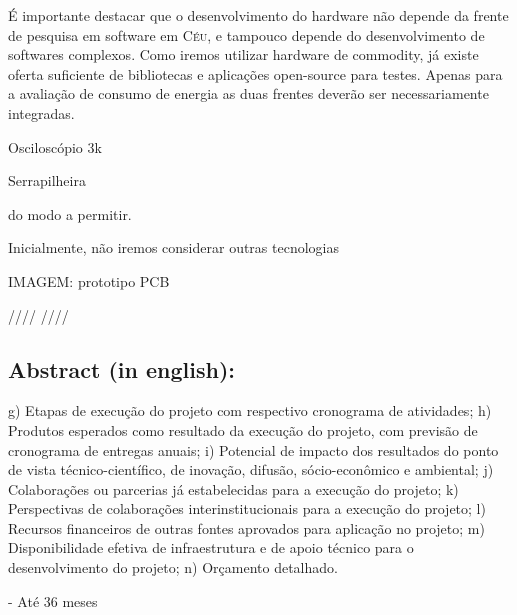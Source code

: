 \documentclass[titlepage,12pt]{article}
\newcommand{\CEU}{\textsc{C\'{e}u}\xspace}
\begin{document}
É importante destacar que o desenvolvimento do hardware não depende da frente
de pesquisa em software em \CEU, e tampouco depende do desenvolvimento de
softwares complexos.
Como iremos utilizar hardware de commodity, já existe oferta suficiente de
bibliotecas e aplicações open-source para testes.
%
Apenas para a avaliação de consumo de energia as duas frentes deverão ser
necessariamente integradas.

Osciloscópio 3k

Serrapilheira


 do modo a permitir.



Inicialmente, não iremos considerar outras tecnologias


IMAGEM: prototipo PCB

////
////

\subsection{ Abstract (in english): }


g) Etapas de execução do projeto com respectivo cronograma de atividades;
h) Produtos esperados como resultado da execução do projeto, com previsão de cronograma
de entregas anuais;
i) Potencial de impacto dos resultados do ponto de vista técnico-científico, de inovação,
difusão, sócio-econômico e ambiental;
j) Colaborações ou parcerias já estabelecidas para a execução do projeto;
k) Perspectivas de colaborações interinstitucionais para a execução do projeto;
l) Recursos financeiros de outras fontes aprovados para aplicação no projeto;
m) Disponibilidade efetiva de infraestrutura e de apoio técnico para o desenvolvimento do
projeto;
n) Orçamento detalhado.

- Até 36 meses


 
\end{document}
